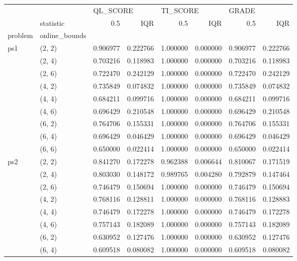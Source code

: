 \begin{tabular}{llrrrrrr}
\toprule
    & {} & \multicolumn{2}{l}{QL\_SCORE} & \multicolumn{2}{l}{TI\_SCORE} & \multicolumn{2}{l}{GRADE} \\
    & statistic &       0.5 &       IQR &       0.5 &       IQR &       0.5 &       IQR \\
problem & online\_bounds &           &           &           &           &           &           \\
\midrule
ps1 & (2, 2) &  0.906977 &  0.222766 &  1.000000 &  0.000000 &  0.906977 &  0.222766 \\
    & (2, 4) &  0.703216 &  0.118983 &  1.000000 &  0.000000 &  0.703216 &  0.118983 \\
    & (2, 6) &  0.722470 &  0.242129 &  1.000000 &  0.000000 &  0.722470 &  0.242129 \\
    & (4, 2) &  0.735849 &  0.074832 &  1.000000 &  0.000000 &  0.735849 &  0.074832 \\
    & (4, 4) &  0.684211 &  0.099716 &  1.000000 &  0.000000 &  0.684211 &  0.099716 \\
    & (4, 6) &  0.696429 &  0.210548 &  1.000000 &  0.000000 &  0.696429 &  0.210548 \\
    & (6, 2) &  0.764706 &  0.155331 &  1.000000 &  0.000000 &  0.764706 &  0.155331 \\
    & (6, 4) &  0.696429 &  0.046429 &  1.000000 &  0.000000 &  0.696429 &  0.046429 \\
    & (6, 6) &  0.650000 &  0.022414 &  1.000000 &  0.000000 &  0.650000 &  0.022414 \\
ps2 & (2, 2) &  0.841270 &  0.172278 &  0.962388 &  0.006644 &  0.810067 &  0.171519 \\
    & (2, 4) &  0.803030 &  0.148172 &  0.989765 &  0.004280 &  0.792879 &  0.147464 \\
    & (2, 6) &  0.746479 &  0.150694 &  1.000000 &  0.000000 &  0.746479 &  0.150694 \\
    & (4, 2) &  0.768116 &  0.128811 &  1.000000 &  0.000000 &  0.768116 &  0.128883 \\
    & (4, 4) &  0.746479 &  0.172278 &  1.000000 &  0.000000 &  0.746479 &  0.172278 \\
    & (4, 6) &  0.757143 &  0.182089 &  1.000000 &  0.000000 &  0.757143 &  0.182089 \\
    & (6, 2) &  0.630952 &  0.127476 &  1.000000 &  0.000000 &  0.630952 &  0.127476 \\
    & (6, 4) &  0.609518 &  0.080082 &  1.000000 &  0.000000 &  0.609518 &  0.080082 \\

\end{tabular}
